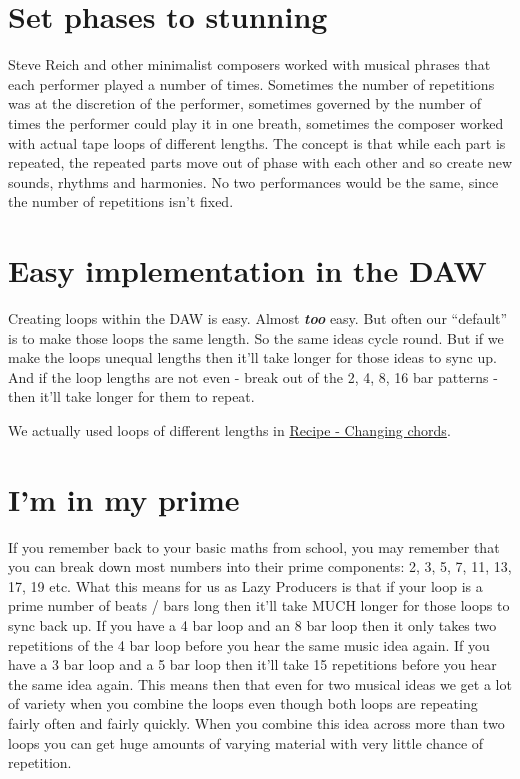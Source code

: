 \documentclass[
  12pt,
  letterpaper,
  oneside,
  open=any]{scrbook}
\begin{document}
\section{Set phases to stunning}\label{set-phases-to-stunning}

Steve Reich and other minimalist composers worked with musical phrases
that each performer played a number of times. Sometimes the number of
repetitions was at the discretion of the performer, sometimes governed
by the number of times the performer could play it in one breath,
sometimes the composer worked with actual tape loops of different
lengths. The concept is that while each part is repeated, the repeated
parts move out of phase with each other and so create new sounds,
rhythms and harmonies. No two performances would be the same, since the
number of repetitions isn't fixed.

\section{Easy implementation in the
DAW}\label{easy-implementation-in-the-daw}

Creating loops within the DAW is easy. Almost \textbf{\emph{too}} easy.
But often our ``default'' is to make those loops the same length. So the
same ideas cycle round. But if we make the loops unequal lengths then
it'll take longer for those ideas to sync up. And if the loop lengths
are not even - break out of the 2, 4, 8, 16 bar patterns - then it'll
take longer for them to repeat.

We actually used loops of different lengths in
\hyperref[Chapter-001-Recipe-Changing_Chords]{Recipe - Changing chords}.

\section{I'm in my prime}\label{im-in-my-prime}

If you remember back to your basic maths from school, you may remember
that you can break down most numbers into their prime components: 2, 3,
5, 7, 11, 13, 17, 19 etc. What this means for us as Lazy Producers is
that if your loop is a prime number of beats / bars long then it'll take
MUCH longer for those loops to sync back up. If you have a 4 bar loop
and an 8 bar loop then it only takes two repetitions of the 4 bar loop
before you hear the same music idea again. If you have a 3 bar loop and
a 5 bar loop then it'll take 15 repetitions before you hear the same
idea again. This means then that even for two musical ideas we get a lot
of variety when you combine the loops even though both loops are
repeating fairly often and fairly quickly. When you combine this idea
across more than two loops you can get huge amounts of varying material
with very little chance of repetition.
\end{document}
